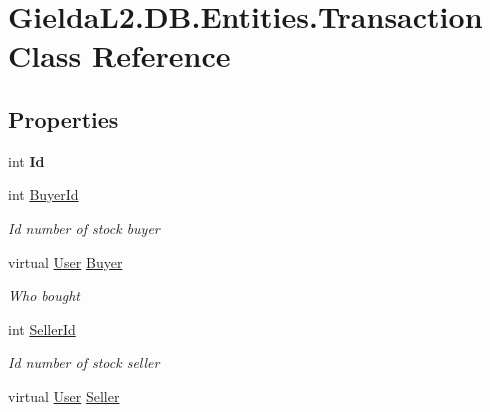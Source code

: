 \hypertarget{class_gielda_l2_1_1_d_b_1_1_entities_1_1_transaction}{}\section{Gielda\+L2.\+D\+B.\+Entities.\+Transaction Class Reference}
\label{class_gielda_l2_1_1_d_b_1_1_entities_1_1_transaction}
\subsection*{Properties}
\begin{DoxyCompactItemize}
\item 
\mbox{\label{class_gielda_l2_1_1_d_b_1_1_entities_1_1_transaction_a7d74b489389af9d24081637f92cc3504}} 
int {\bfseries Id}
\item 
int \mbox{\hyperlink{class_gielda_l2_1_1_d_b_1_1_entities_1_1_transaction_a1371168bcc648d083c925bd78ecc996e}{Buyer\+Id}}
\begin{DoxyCompactList}\small\item\em Id number of stock buyer \end{DoxyCompactList}\item 
virtual \mbox{\hyperlink{class_gielda_l2_1_1_d_b_1_1_entities_1_1_user}{User}} \mbox{\hyperlink{class_gielda_l2_1_1_d_b_1_1_entities_1_1_transaction_aca614107616f9aa53806241d823d7b15}{Buyer}}
\begin{DoxyCompactList}\small\item\em Who bought \end{DoxyCompactList}\item 
int \mbox{\hyperlink{class_gielda_l2_1_1_d_b_1_1_entities_1_1_transaction_a6948eeb4589ca30831f461b95b4f706d}{Seller\+Id}}
\begin{DoxyCompactList}\small\item\em Id number of stock seller \end{DoxyCompactList}\item 
virtual \mbox{\hyperlink{class_gielda_l2_1_1_d_b_1_1_entities_1_1_user}{User}} \mbox{\hyperlink{class_gielda_l2_1_1_d_b_1_1_entities_1_1_transaction_a631476f3e49ea7b21f6a61542c6d729b}{Seller}}

\end{DoxyCompactItemize}
